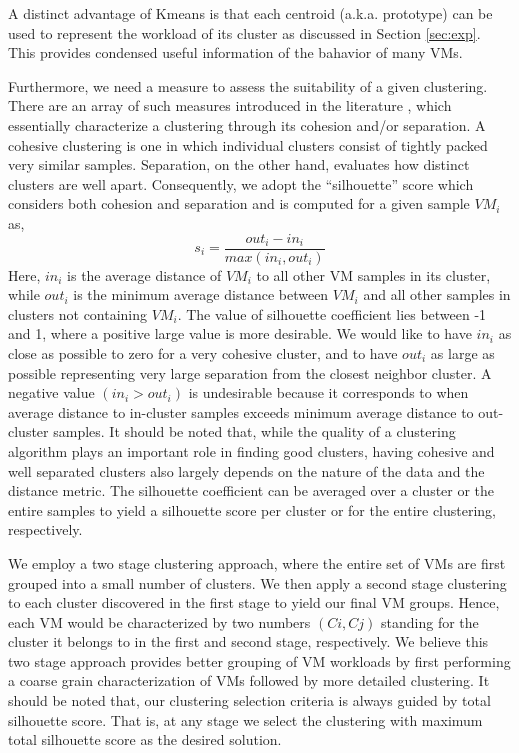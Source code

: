 \documentclass[10pt, conference, compsocconf]{IEEEtran}
\begin{document}
A distinct advantage of Kmeans is that each centroid (a.k.a. prototype) can be used to represent the workload of its cluster as discussed in Section \ref{sec:exp}. This provides condensed useful information of the bahavior of many VMs. 

Furthermore, we need a measure to assess the suitability of a given clustering. There are an array of such measures introduced in the literature \cite{kmeans4}, which essentially characterize a clustering through its cohesion and/or separation. A cohesive clustering is one in which individual clusters consist of tightly packed very similar samples. Separation, on the other hand, evaluates how distinct clusters are well apart. Consequently, we adopt the ``silhouette'' score \cite{sil} which considers both cohesion and separation and is computed for a given sample $VM_i$ as,
%
\begin{equation}
s_i = \frac{out_i - in_i}{max(in_i,out_i)}
\label{eq:sil}
\end{equation}
%
Here, $in_i$ is the average distance of $VM_i$ to all other VM samples in its cluster, while $out_i$ is the minimum average distance between $VM_i$ and all other samples in clusters not containing $VM_i$. The value of silhouette coefficient lies between -1 and 1, where a positive large value is more desirable. We would like to have $in_i$ as close as possible to zero for a very cohesive cluster, and to have $out_i$ as large as possible representing very large separation from the closest neighbor cluster. A negative value $(in_i > out_i)$ is undesirable because it corresponds to when average distance to in-cluster samples exceeds minimum average distance to out-cluster samples. It should be noted that, while the quality of a clustering algorithm plays an important role in finding good clusters, having cohesive and well separated clusters also largely depends on the nature of the data and the distance metric. The silhouette coefficient can be averaged over a cluster or the entire samples to yield a silhouette score per cluster or for the entire clustering, respectively. 

We employ a two stage clustering approach, where the entire set of VMs are first grouped into a small number of clusters. We then apply a second stage clustering to each cluster discovered in the first stage to yield our final VM groups. Hence, each VM would be characterized by two numbers $(Ci,Cj)$ standing for the cluster it belongs to in the first and second stage, respectively. We believe this two stage approach provides better grouping of VM workloads by first performing a coarse grain characterization of VMs followed by more detailed clustering. It should be noted that, our clustering selection criteria is always guided by total silhouette score. That is, at any stage we select the clustering with maximum total silhouette score as the desired solution. 
\end{document}
